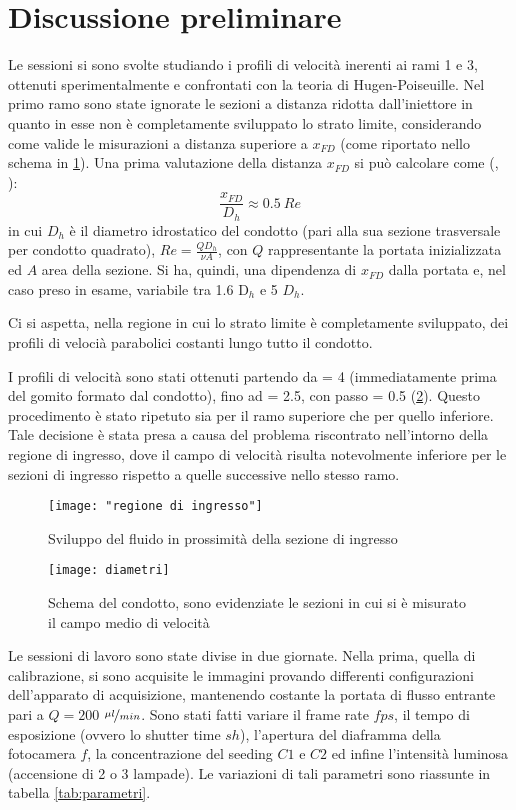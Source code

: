 \documentclass{article} %
\newcommand{\xd}{\nicefrac{\textrm{x}}{\textrm{D}}}
\begin{document}
\section{Discussione preliminare}
Le sessioni si sono svolte studiando i profili di velocità inerenti ai rami 1 e 3, ottenuti sperimentalmente e confrontati con la teoria di Hugen-Poiseuille. Nel primo ramo sono state ignorate le sezioni a distanza ridotta dall'iniettore in quanto in esse non è completamente sviluppato lo strato limite, considerando come valide le misurazioni a distanza superiore a $x_{FD}$ (come riportato nello schema in \cref{fig:regione_ingresso}). Una prima valutazione della distanza $x_{FD}$ si può calcolare come (\cite{kays93}, \cite{shah87}):
\begin{displaymath}
	\frac{x_{FD}}{D_{h}} \approx 0.5\ Re
\end{displaymath} in cui $D_h$ è il diametro idrostatico del condotto (pari alla sua sezione trasversale per condotto quadrato), $Re = \frac{Q D_{h}}{\nu A}$, con $Q$ rappresentante la portata inizializzata ed $A$ area della sezione. Si ha, quindi, una dipendenza di $x_{FD}$ dalla portata e, nel caso preso in esame, variabile tra 1.6 D$_h$ e 5 $D_h$.\par
Ci si aspetta, nella regione in cui lo strato limite è completamente sviluppato, dei profili di velocià parabolici costanti lungo tutto il condotto.\par
I profili di velocità sono stati ottenuti partendo da \xd = 4 (immediatamente prima del gomito formato dal condotto), fino ad \xd = 2.5, con passo \xd = 0.5 (\cref{fig:Condotto}). Questo procedimento è stato ripetuto sia per il ramo superiore che per quello inferiore. Tale decisione è stata presa a causa del problema riscontrato nell'intorno della regione di ingresso, dove il campo di velocità risulta notevolmente inferiore per le sezioni di ingresso rispetto a quelle successive nello stesso ramo.\par
\begin{figure}[h]
	\centering
	\texttt{[image: "regione di ingresso"]}
	\caption{Sviluppo del fluido in prossimità della sezione di ingresso}
	\label{fig:regione_ingresso}
\end{figure}
\begin{figure}[h]
	\centering
	\texttt{[image: diametri]}
	\caption{Schema del condotto, sono evidenziate le sezioni in cui si è misurato il campo medio di velocità}
	\label{fig:Condotto}
\end{figure}
Le sessioni di lavoro sono state divise in due giornate. Nella prima, quella di calibrazione, si sono acquisite le immagini provando differenti configurazioni dell'apparato di acquisizione, mantenendo costante la portata di flusso entrante pari a $Q = 200$ $\nicefrac{\mu l}{min}$. Sono stati fatti variare il frame rate $fps$, il tempo di esposizione (ovvero lo shutter time $sh$), l'apertura del diaframma della fotocamera $f$, la concentrazione del seeding $C1$ e $C2$ ed infine l'intensità luminosa (accensione di 2 o 3 lampade). Le variazioni di tali parametri sono riassunte in tabella \ref{tab:parametri}.
\end{document}
